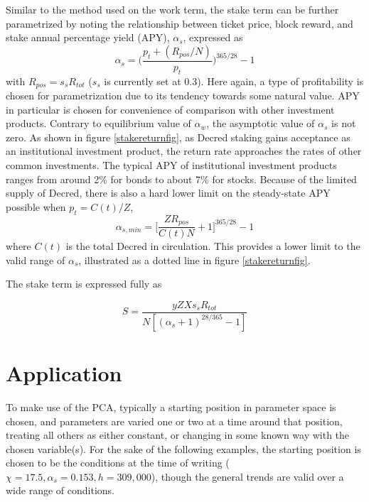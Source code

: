 \documentclass[a4paper,12pt]{article}
\begin{document}
Similar to the method used on the work term, the stake term can be further parametrized by noting the relationship between ticket price, block reward, and stake annual percentage yield (APY), $ \alpha_s $, expressed as
%
\begin{equation}
\alpha_s = \bigg( \frac{ p_t + (R_{pos} / N) }{ p_t } \bigg)^{365/28} - 1
\end{equation}
%
with $ R_{pos} = s_s R_{tot} $ ($ s_s $ is currently set at 0.3). Here again, a type of profitability is chosen for parametrization due to its tendency towards some natural value. APY in particular is chosen for convenience of comparison with other investment products. Contrary to equilibrium value of $ \alpha_w $, the asymptotic value of $ \alpha_s $ is not zero. As shown in figure \ref{stakereturnfig}, as Decred staking gains acceptance as an institutional investment product, the return rate approaches the rates of other common investments. The typical APY of institutional investment products ranges from around 2\% for bonds to about 7\% for stocks. Because of the limited supply of Decred, there is also a hard lower limit on the steady-state APY possible when $ p_t = C(t) / Z $,
%
\begin{equation}
\alpha_{s, min} = \Big[ \frac{ Z R_{pos} }{ C(t) N } + 1 \Big]^{365/28} - 1
\end{equation}
%
where $ C(t) $ is the total Decred in circulation. This provides a lower limit to the valid range of $ \alpha_s $, illustrated as a dotted line in figure \ref{stakereturnfig}. 


The stake term is expressed fully as

\begin{equation}
S = \frac{ yZXs_sR_{tot} }{ N [ ( \alpha_s + 1)^{28/365} - 1 ] }
\end{equation} 

\section{Application}

To make use of the PCA, typically a starting position in parameter space is chosen, and parameters are varied one or two at a time around that position, treating all others as either constant, or changing in some known way with the chosen variable(s). For the sake of the following examples, the starting position is chosen to be the conditions at the time of writing ($ \chi = 17.5, \alpha_s = 0.153, h=309,000 $), though the general trends are valid over a wide range of conditions.
\end{document}
